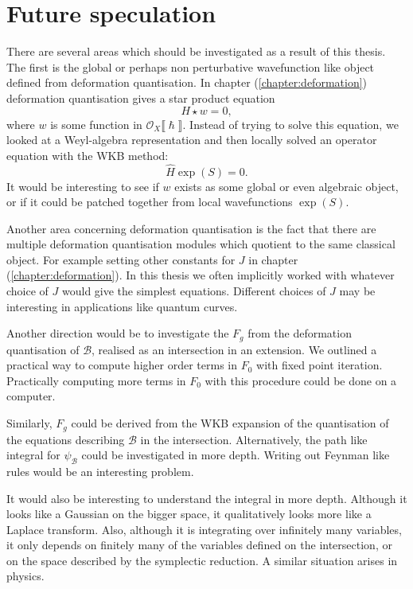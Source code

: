 \chapter{Future speculation}

There are several areas which should be investigated as a result of this thesis. The first is the global or perhaps non perturbative wavefunction like object defined from deformation quantisation. In chapter (\ref{chapter:deformation}) deformation quantisation  gives a star product equation 
\[ H \star w = 0,\]
where \(w\) is some function in \( \mathcal{O}_X \lBrack \hslash \rBrack \). Instead of trying to solve this equation, we looked at a Weyl-algebra representation and then locally solved an operator equation with the WKB method:
\[ \widehat{ H } \exp(S)  = 0.\]
It would be interesting to see if \(w\) exists as some global or even algebraic object, or if it could be patched together from local wavefunctions \( \exp(S)\).

Another area concerning deformation quantisation is the fact that there are multiple deformation quantisation modules which quotient to the same classical object. For example setting other constants for \(J\) in chapter (\ref{chapter:deformation}). In this thesis we often implicitly worked with whatever choice of \(J\) would give the simplest equations. Different choices of \(J\) may be interesting in applications like quantum curves.

Another direction would be to investigate the \(F_{g}\) from the deformation quantisation of \( \mathcal{B}\), realised as an intersection in an extension. We outlined a practical way to compute higher order terms in \(F_0\) with fixed point iteration. Practically computing more terms in \(F_0\) with this procedure could be done on a computer.

Similarly, \( F_g\) could be derived from the WKB expansion of the quantisation of the equations describing \( \mathcal{B}\) in the intersection. Alternatively, the path like integral for \( \psi_{\mathcal{B}}\) could be investigated in more depth. Writing out Feynman like rules would be an interesting problem.

It would also be interesting to understand the integral in more depth. Although it looks like a Gaussian on the bigger space, it qualitatively looks more like a Laplace transform. Also, although it is integrating over infinitely many variables, it only depends on finitely many of the variables defined on the intersection, or on the space described by the symplectic reduction. A similar situation arises in physics.